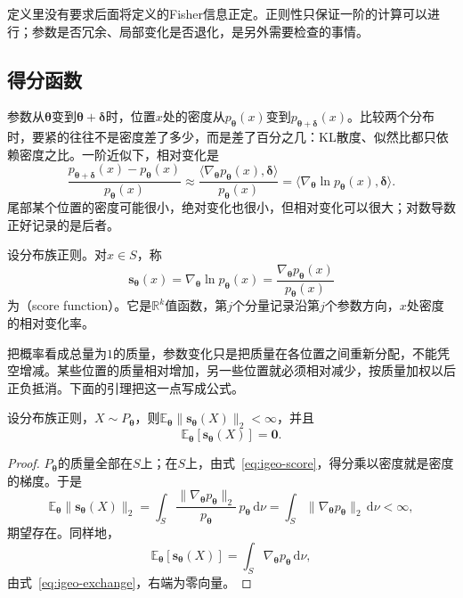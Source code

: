 定义里没有要求后面将定义的Fisher信息正定。正则性只保证一阶的计算可以进行；参数是否冗余、局部变化是否退化，是另外需要检查的事情。

\subsection{得分函数}
\label{sec:igeo-score}

参数从$\bm{\theta}$变到$\bm{\theta}+\bm{\delta}$时，位置$x$处的密度从$p_{\bm{\theta}}(x)$变到$p_{\bm{\theta}+\bm{\delta}}(x)$。比较两个分布时，要紧的往往不是密度差了多少，而是差了百分之几：KL散度、似然比都只依赖密度之比。一阶近似下，相对变化是
\[
  \frac{p_{\bm{\theta}+\bm{\delta}}(x)-p_{\bm{\theta}}(x)}{p_{\bm{\theta}}(x)}\approx\frac{\langle\nabla_{\bm{\theta}}p_{\bm{\theta}}(x),\bm{\delta}\rangle}{p_{\bm{\theta}}(x)}=\langle\nabla_{\bm{\theta}}\ln p_{\bm{\theta}}(x),\bm{\delta}\rangle .
\]
尾部某个位置的密度可能很小，绝对变化也很小，但相对变化可以很大；对数导数正好记录的是后者。

\begin{definition}[得分函数]
\label{def:igeo-score}
设分布族正则。对$x\in S$，称
\begin{equation}
  \bm{s}_{\bm{\theta}}(x)=\nabla_{\bm{\theta}}\ln p_{\bm{\theta}}(x)=\frac{\nabla_{\bm{\theta}}p_{\bm{\theta}}(x)}{p_{\bm{\theta}}(x)}
  \label{eq:igeo-score}
\end{equation}
为（score function）。它是$\mathbb{R}^{k}$值函数，第$j$个分量记录沿第$j$个参数方向，$x$处密度的相对变化率。
\end{definition}

把概率看成总量为$1$的质量，参数变化只是把质量在各位置之间重新分配，不能凭空增减。某些位置的质量相对增加，另一些位置就必须相对减少，按质量加权以后正负抵消。下面的引理把这一点写成公式。

\begin{lemma}[得分的期望为零]
\label{lem:igeo-score-mean}
设分布族正则，$X\sim P_{\bm{\theta}}$，则$\mathbb{E}_{\bm{\theta}}\lVert\bm{s}_{\bm{\theta}}(X)\rVert_2<\infty$，并且
\begin{equation}
  \mathbb{E}_{\bm{\theta}}[\bm{s}_{\bm{\theta}}(X)]=\bm{0}.
  \label{eq:igeo-score-mean}
\end{equation}
\end{lemma}

\begin{proof}
$P_{\bm{\theta}}$的质量全部在$S$上；在$S$上，由式~\eqref{eq:igeo-score}，得分乘以密度就是密度的梯度。于是
\[
  \mathbb{E}_{\bm{\theta}}\lVert\bm{s}_{\bm{\theta}}(X)\rVert_2=\int_{S}\frac{\lVert\nabla_{\bm{\theta}}p_{\bm{\theta}}\rVert_2}{p_{\bm{\theta}}}\,p_{\bm{\theta}}\,\mathrm{d}\nu=\int_{S}\lVert\nabla_{\bm{\theta}}p_{\bm{\theta}}\rVert_2\,\mathrm{d}\nu<\infty ,
\]
期望存在。同样地，
\[
  \mathbb{E}_{\bm{\theta}}[\bm{s}_{\bm{\theta}}(X)]=\int_{S}\nabla_{\bm{\theta}}p_{\bm{\theta}}\,\mathrm{d}\nu ,
\]
由式~\eqref{eq:igeo-exchange}，右端为零向量。
\end{proof}

